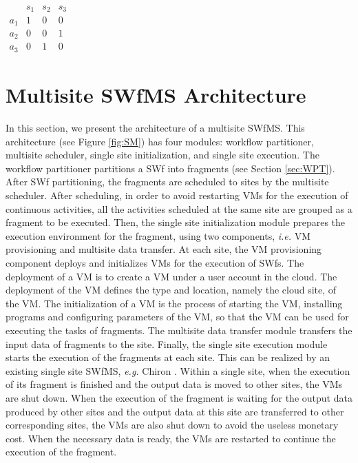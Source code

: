 $
\begin{matrix}
 & s_1 & s_2 & s_3 \\
 a_1 &  1 & 0 & 0 \\
 a_2 & 0 & 0 & 1 \\
 a_3 & 0 & 1 & 0
\end{matrix}
$



\section{Multisite SWfMS Architecture}
\label{sec:MSD}

In this section, we present the architecture of a multisite SWfMS.
This architecture (see Figure \ref{fig:SM}) has four modules: workflow partitioner, multisite scheduler, single site initialization, and single site execution. The workflow partitioner partitions a SWf into fragments (see Section \ref{sec:WPT}). After SWf partitioning, the fragments are scheduled to sites by the multisite scheduler. After scheduling, in order to avoid restarting VMs for the execution of continuous activities, all the activities scheduled at the same site are grouped as a fragment to be executed. Then, the single site initialization module prepares the execution environment for the fragment, using two components, \textit{i.e.} VM provisioning and multisite data transfer. At each site, the VM provisioning component deploys and initializes VMs for the execution of SWfs. The deployment of a VM is to create a VM under a user account in the cloud. The deployment of the VM defines the type and location, namely the cloud site, of the VM. 
The initialization of a VM is the process of starting the VM, installing programs and configuring parameters of the VM, so that the VM can be used for executing the tasks of fragments.
The multisite data transfer module transfers the input data of fragments to the site.
Finally, the single site execution module starts the execution of the fragments at each site. This can be realized by an existing single site SWfMS, \textit{e.g.} Chiron \cite{Ogasawara2013}. Within a single site, when the execution of its fragment is finished and the output data is moved to other sites, the VMs are shut down. When the execution of the fragment is waiting for the output data produced by other sites and the output data at this site are transferred to other corresponding sites, the VMs are also shut down to avoid the useless monetary cost. When the necessary data is ready, the VMs are restarted to continue the execution of the fragment. 

